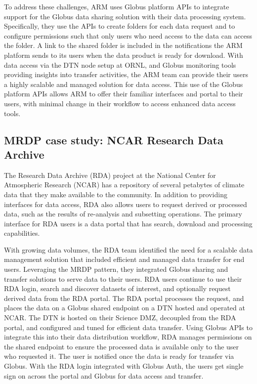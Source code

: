 \documentclass[10pt]{article}
\begin{document}
To address these challenges, ARM uses Globus platform APIs to integrate support for the Globus data sharing solution with their data processing system. 
Specifically, they use the APIs to create folders for each data request and to configure permissions such that only users who need access to the data can access the folder. 
A link to the shared folder is included in the notifications the ARM platform sends to its users when the data product is ready for download. 
With data access via the DTN node setup at ORNL, and Globus monitoring tools providing insights into transfer activities, the ARM team can provide their users a highly scalable and managed solution for data access. 
This use of the Globus platform APIs allows ARM  to offer their familiar interfaces and portal to their users, with minimal change in their workflow to access enhanced data access tools.



\subsection*{MRDP case study: NCAR Research Data Archive}

The Research Data Archive (RDA) project at the National Center for Atmospheric Research (NCAR) has a repository of several petabytes of climate data that they make available to the community. In addition to providing interfaces for data access, RDA also allows users to request derived or processed data, such as the results of re-analysis and subsetting operations. The primary interface for RDA users is a data portal that has search, download and processing capabilities. 

With growing data volumes, the RDA team identified the need for a scalable data management solution that included efficient and managed data transfer for end users. 
Leveraging the MRDP pattern, they integrated Globus sharing and transfer solutions to serve data to their users. 
RDA users continue to use their RDA login, search and discover datasets of interest, and optionally request derived data from the RDA portal. 
The RDA portal processes the request, and places the data on a Globus shared endpoint on a DTN hosted and operated at NCAR. 
The DTN is hosted on their Science DMZ, decoupled from the RDA portal, and configured and tuned for efficient data transfer. 
Using Globus APIs to integrate this into their data distribution workflow, RDA manages permissions on the shared endpoint to ensure the processed data is available only to the user who requested it. The user is notified once the data is ready for transfer via Globus. With the RDA login integrated with Globus Auth, the users get single sign on across the portal and Globus for data access and transfer. 
\end{document}
